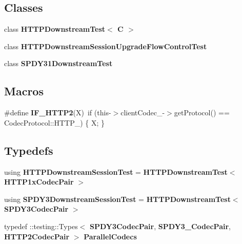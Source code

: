 \subsection*{Classes}
\begin{DoxyCompactItemize}
\item 
class {\bf H\+T\+T\+P\+Downstream\+Test$<$ C $>$}
\item 
class {\bf H\+T\+T\+P\+Downstream\+Session\+Upgrade\+Flow\+Control\+Test}
\item 
class {\bf S\+P\+D\+Y31\+Downstream\+Test}
\end{DoxyCompactItemize}
\subsection*{Macros}
\begin{DoxyCompactItemize}
\item 
\#define {\bf I\+F\+\_\+\+H\+T\+T\+P2}(X)~if (this-\/$>$client\+Codec\+\_\+-\/$>$get\+Protocol() == Codec\+Protocol\+::\+H\+T\+T\+P\+\_) \{ X; \}
\end{DoxyCompactItemize}
\subsection*{Typedefs}
\begin{DoxyCompactItemize}
\item 
using {\bf H\+T\+T\+P\+Downstream\+Session\+Test} = {\bf H\+T\+T\+P\+Downstream\+Test}$<$ {\bf H\+T\+T\+P1x\+Codec\+Pair} $>$
\item 
using {\bf S\+P\+D\+Y3\+Downstream\+Session\+Test} = {\bf H\+T\+T\+P\+Downstream\+Test}$<$ {\bf S\+P\+D\+Y3\+Codec\+Pair} $>$
\item 
typedef \+::testing\+::\+Types$<$ {\bf S\+P\+D\+Y3\+Codec\+Pair}, {\bf S\+P\+D\+Y3\+\_\+Codec\+Pair}, {\bf H\+T\+T\+P2\+Codec\+Pair} $>$ {\bf Parallel\+Codecs}
\end{DoxyCompactItemize}

